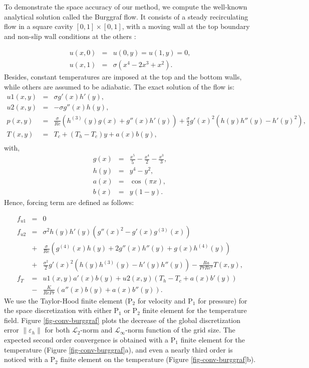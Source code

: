To demonstrate the space accuracy of our method, we compute the well-known analytical solution called the Burggraf flow.
It consists of a steady recirculating flow in a square cavity $[ 0 , 1] \times [ 0 , 1]$, with a moving wall at the top boundary and non-slip wall conditions at the others :

\begin{eqnarray}
   u(x,0) &=& u(0,y) = u(1,y) = 0, \\
   u(x,1) &=& \sigma (x^4 - 2x^3 + x^2).
\end{eqnarray}
Besides, constant temperatures are imposed at the top and the bottom walls, while others are assumed to be adiabatic.
The exact solution of the flow is:
\begin{eqnarray}
   u1(x,y) &=& \sigma g'(x) h'(y), \\\nonumber
   u2(x,y) &=& - \sigma g''(x) h(y), \\\nonumber
   p(x,y)   &=& \frac{\sigma}{Re} \left( h^{(3)}(y) g(x) + g''(x)h'(y) \right) + \frac{\sigma}{2} g'(x)^2 \left( h(y)h''(y)-h'(y)^2 \right),\\ \nonumber
   T(x,y) &=& T_{c} + (T_{h} - T_{c}) y + a(x) b(y), \\ \nonumber
\end{eqnarray}
with,
\begin{eqnarray}
   g(x) &=& \frac{x^5}{5} - \frac{x^4}{2} - \frac{x^3}{3}, \\ \nonumber
   h(y) &=& y^4 - y^2, \\ \nonumber
   a(x) &=& \cos (\pi x), \\ \nonumber
   b(x) &=& y(1-y).
\end{eqnarray}
Hence, forcing term are defined as follows:

\begin{eqnarray}
   f_{u1} &=& 0 \\ \nonumber
   f_{u2} &=& \sigma^2 h(y) h'(y) \left( g''(x)^2 - g'(x)g^{(3)}(x) \right) \\ \nonumber
   &+& \frac{\sigma}{Re}\left( g^{(4)}(x) h(y) + 2 g''(x)h''(y) + g(x) h^{(4)}(y) \right) \\ \nonumber
   &+& \frac{\sigma^2}{2} g'(x)^2 \left( h(y) h^{(3)}(y) - h'(y)h''(y) \right) - \frac{Ra}{Pr Re^2} T(x,y),\\ \nonumber
   f_T &=& u1(x,y) a'(x) b(y) + u2(x,y) \left( T_h - T_c + a(x) b'(y) \right) \\ \nonumber
   &-& \frac{K}{Re Pr} \left( a''(x)b(y) + a(x) b''(y) \right).
\end{eqnarray}
We use the Taylor-Hood finite element (P$_2$ for velocity and P$_1$ for pressure) for the space discretization with either P$_1$ or P$_2$ finite element for the temperature field.
Figure \ref{fig-conv-burggraf} plots the decrease of the global discretization error $\| \varepsilon_h \|$ for both $\mathcal{L}_2$-norm and $\mathcal{L}_\infty$-norm function of the grid size.
The expected second order convergence is obtained with a P$_1$ finite element for the temperature (Figure \ref{fig-conv-burggraf}a), and even a nearly third order is noticed with a P$_2$ finite element on the temperature (Figure \ref{fig-conv-burggraf}b).

